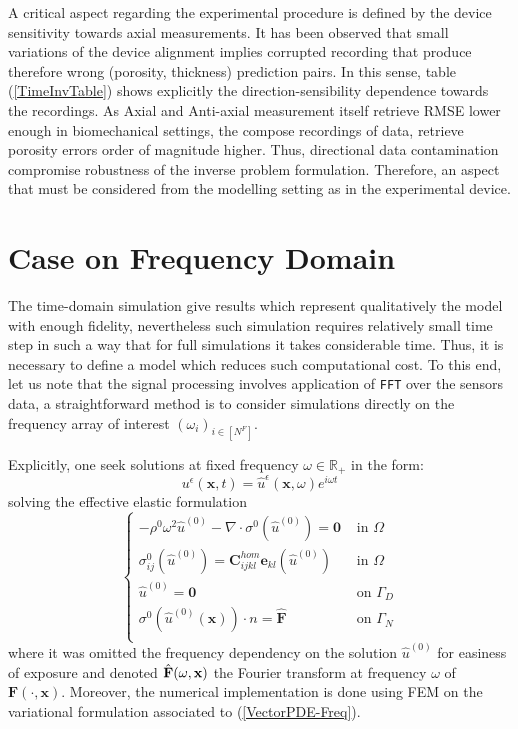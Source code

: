 A critical aspect regarding the experimental procedure is defined by the device sensitivity towards axial measurements. It has been observed that small variations of the device alignment implies corrupted recording that produce therefore wrong (porosity, thickness) prediction pairs.
In this sense, table (\ref{TimeInvTable}) shows explicitly the direction-sensibility dependence towards the recordings. As Axial and Anti-axial measurement itself retrieve RMSE lower enough in biomechanical settings, the compose recordings of data, retrieve porosity errors order of magnitude higher. Thus, directional data contamination compromise robustness of the inverse problem formulation. Therefore, an aspect that must be considered from the modelling setting as in the experimental device.


\section{Case on Frequency Domain}

The time-domain simulation give results which represent qualitatively the model with enough fidelity, nevertheless such simulation requires relatively small time step in such a way that for full simulations it takes considerable time. Thus, it is necessary to define a model which reduces such computational cost.
To this end, let us note that the signal processing involves application of \texttt{FFT} over the sensors data, a straightforward method is to consider simulations directly on the frequency array of interest $(\omega_i)_{i \in [N^F]}$. 

Explicitly, one seek solutions at fixed frequency $\omega \in \mathbb{R}_+$ in the form:
\begin{equation}
    \label{FreqAnsatz}
    u^{\epsilon}(\mathbf{x},t) = \hat{u}^{\epsilon}(\mathbf{x},\omega) e^{i \omega t}
\end{equation}
solving the effective elastic formulation 
\begin{equation}
    \label{VectorPDE-Freq}
    \left \{
    \begin{array}{cc}
        -\rho^{0} \omega^2 \hat{u}^{(0)} - \nabla \cdot \sigma^{0} (\hat{u}^{(0)})=\mathbf{0}  & \text{ in }  \Omega \\
        \sigma^{0}_{ij} (\hat{u}^{(0)}) = \mathbf{C}^{hom}_{ijkl} \mathbf{e}_{kl} (\hat{u}^{(0)}) & \text{ in } \Omega  \\
        \hat{u}^{(0)} = \mathbf{0} & \text{ on } \Gamma_D\\
        \sigma^{0} (\hat{u}^{(0)}(\mathbf{x}))\cdot n = \hat{\mathbf{F}} & \text{ on } \Gamma_N \\
    \end{array}
    \right .
\end{equation}
where it was omitted the frequency dependency on the solution $\hat{u}^{(0)}$ for easiness of exposure and denoted $\Hat{\mathbf{F}}(\omega, \mathbf{x})$ the Fourier transform at frequency $\omega$ of $\mathbf{F}(\cdot, \mathbf{x})$. Moreover, the numerical implementation is done using FEM on the variational formulation associated to (\ref{VectorPDE-Freq}).

